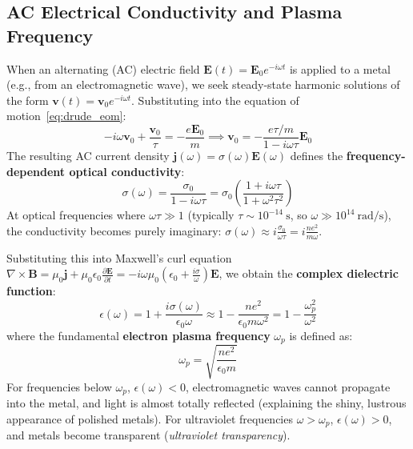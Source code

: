 \documentclass[11pt,a4paper]{article}
\newcommand{\vb}[1]{\mathbf{#1}}
\begin{document}
\subsection{AC Electrical Conductivity and Plasma Frequency}
When an alternating (AC) electric field $\vb{E}(t) = \vb{E}_0 e^{-i\omega t}$ is applied to a metal (e.g., from an electromagnetic wave), we seek steady-state harmonic solutions of the form $\vb{v}(t) = \vb{v}_0 e^{-i\omega t}$. Substituting into the equation of motion~\eqref{eq:drude_eom}:
\begin{equation}
-i\omega \vb{v}_0 + \frac{\vb{v}_0}{\tau} = -\frac{e\vb{E}_0}{m} \implies \vb{v}_0 = -\frac{e\tau/m}{1 - i\omega\tau}\vb{E}_0
\end{equation}
The resulting AC current density $\vb{j}(\omega) = \sigma(\omega)\vb{E}(\omega)$ defines the \textbf{frequency-dependent optical conductivity}:
\begin{equation}
\boxed{\sigma(\omega) = \frac{\sigma_0}{1 - i\omega\tau} = \sigma_0 \left( \frac{1 + i\omega\tau}{1 + \omega^2\tau^2} \right)}
\label{eq:ac_conductivity}
\end{equation}
At optical frequencies where $\omega\tau \gg 1$ (typically $\tau \sim 10^{-14}\ \mathrm{s}$, so $\omega \gg 10^{14}\ \mathrm{rad/s}$), the conductivity becomes purely imaginary: $\sigma(\omega) \approx i \frac{\sigma_0}{\omega\tau} = i \frac{ne^2}{m\omega}$. 

Substituting this into Maxwell's curl equation $\nabla \times \vb{B} = \mu_0 \vb{j} + \mu_0\epsilon_0 \frac{\partial\vb{E}}{\partial t} = -i\omega\mu_0 \left(\epsilon_0 + \frac{i\sigma}{\omega}\right)\vb{E}$, we obtain the \textbf{complex dielectric function}:
\begin{equation}
\epsilon(\omega) = 1 + \frac{i\sigma(\omega)}{\epsilon_0 \omega} \approx 1 - \frac{n e^2}{\epsilon_0 m \omega^2} = 1 - \frac{\omega_p^2}{\omega^2}
\label{eq:plasma_dielectric}
\end{equation}
where the fundamental \textbf{electron plasma frequency} $\omega_p$ is defined as:
\begin{equation}
\boxed{\omega_p = \sqrt{\frac{n e^2}{\epsilon_0 m}}}
\label{eq:plasma_frequency}
\end{equation}
For frequencies below $\omega_p$, $\epsilon(\omega) < 0$, electromagnetic waves cannot propagate into the metal, and light is almost totally reflected (explaining the shiny, lustrous appearance of polished metals). For ultraviolet frequencies $\omega > \omega_p$, $\epsilon(\omega) > 0$, and metals become transparent (\emph{ultraviolet transparency}).
\end{document}
